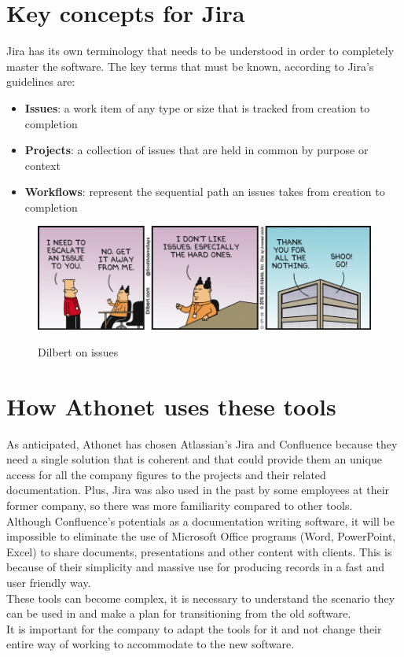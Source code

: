 \section{Key concepts for Jira}\label{sec:concepts}
	Jira has its own terminology that needs to be understood in order to completely master the software.
	The key terms that must be known, according to Jira's guidelines\cite{key-terms-to-know} are:
	\begin{itemize}
		\item \textbf{Issues}: a work item of any type or size that is tracked from creation to completion
		\item \textbf{Projects}: a collection of issues that are held in common by purpose or context
		\item \textbf{Workflows}: represent the sequential path an issues takes from creation to completion
	\end{itemize}
	\begin{figure}[H]
		\centering
		\includegraphics[width=\textwidth]{resources/issues}\\
		\caption{Dilbert on issues}
	\end{figure}
	
\section{How Athonet uses these tools}
	As anticipated, Athonet has chosen Atlassian's Jira and Confluence because they need a single solution that is coherent and that could provide them an unique access for all the company figures to the projects and their related documentation.
	Plus, Jira was also used in the past by some employees at their former company, so there was more familiarity compared to other tools.\\
	Although Confluence's potentials as a documentation writing software, it will be impossible to eliminate the use of Microsoft Office programs (Word, PowerPoint, Excel) to share documents, presentations and other content with clients.
	This is because of their simplicity and massive use for producing records in a fast and user friendly way.\\
	These tools can become complex, it is necessary to understand the scenario they can be used in and make a plan for transitioning from the old software.\\
	It is important for the company to adapt the tools for it and not change their entire way of working to accommodate to the new software.
